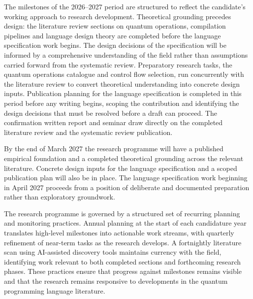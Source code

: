 The milestones of the 2026--2027 period are structured to reflect the candidate's working approach to research development.
Theoretical grounding precedes design: the literature review sections on quantum operations, compilation pipelines and language design theory are completed before the language specification work begins.
The design decisions of the specification will be informed by a comprehensive understanding of the field rather than assumptions carried forward from the systematic review.
Preparatory research tasks, the quantum operations catalogue and control flow selection, run concurrently with the literature review to convert theoretical understanding into concrete design inputs.
Publication planning for the language specification is completed in this period before any writing begins, scoping the contribution and identifying the design decisions that must be resolved before a draft can proceed.
The confirmation written report and seminar draw directly on the completed literature review and the systematic review publication.

By the end of March 2027 the research programme will have a published empirical foundation and a completed theoretical grounding across the relevant literature.
Concrete design inputs for the language specification and a scoped publication plan will also be in place.
The language specification work beginning in April 2027 proceeds from a position of deliberate and documented preparation rather than exploratory groundwork.

The research programme is governed by a structured set of recurring planning and monitoring practices.
Annual planning at the start of each candidature year translates high-level milestones into actionable work streams, with quarterly refinement of near-term tasks as the research develops.
A fortnightly literature scan using AI-assisted discovery tools maintains currency with the field, identifying work relevant to both completed sections and forthcoming research phases.
These practices ensure that progress against milestones remains visible and that the research remains responsive to developments in the quantum programming language literature.